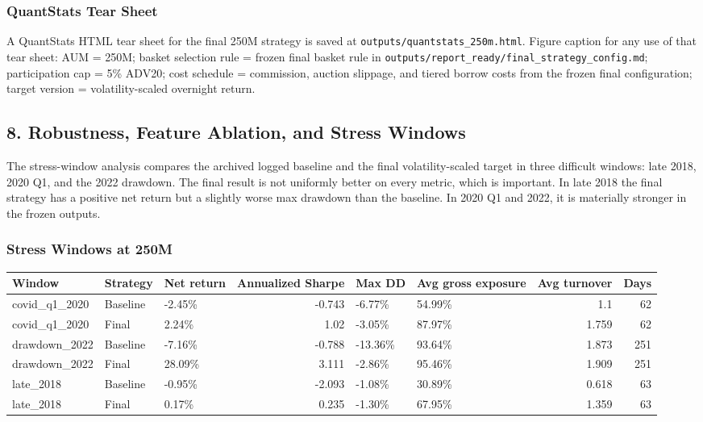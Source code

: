 \documentclass[
]{article}
\begin{document}
\hypertarget{quantstats-tear-sheet}{%
\subsubsection{QuantStats Tear Sheet}\label{quantstats-tear-sheet}}

A QuantStats HTML tear sheet for the final 250M strategy is saved at
\texttt{outputs/quantstats\_250m.html}. Figure caption for any use of
that tear sheet: AUM = 250M; basket selection rule = frozen final basket
rule in \texttt{outputs/report\_ready/final\_strategy\_config.md};
participation cap = 5\% ADV20; cost schedule = commission, auction
slippage, and tiered borrow costs from the frozen final configuration;
target version = volatility-scaled overnight return.

\hypertarget{8-robustness-feature-ablation-and-stress-windows}{%
\subsection{8. Robustness, Feature Ablation, and Stress
Windows}\label{8-robustness-feature-ablation-and-stress-windows}}

The stress-window analysis compares the archived logged baseline and the
final volatility-scaled target in three difficult windows: late 2018,
2020 Q1, and the 2022 drawdown. The final result is not uniformly better
on every metric, which is important. In late 2018 the final strategy has
a positive net return but a slightly worse max drawdown than the
baseline. In 2020 Q1 and 2022, it is materially stronger in the frozen
outputs.

\hypertarget{stress-windows-at-250m}{%
\subsubsection{Stress Windows at 250M}\label{stress-windows-at-250m}}

\begin{longtable}[]{@{}lllrllrr@{}}
\toprule
Window & Strategy & Net return & Annualized Sharpe & Max DD & Avg gross
exposure & Avg turnover & Days \\
\midrule
\endhead
covid\_q1\_2020 & Baseline & -2.45\% & -0.743 & -6.77\% & 54.99\% & 1.1
& 62 \\
covid\_q1\_2020 & Final & 2.24\% & 1.02 & -3.05\% & 87.97\% & 1.759 &
62 \\
drawdown\_2022 & Baseline & -7.16\% & -0.788 & -13.36\% & 93.64\% &
1.873 & 251 \\
drawdown\_2022 & Final & 28.09\% & 3.111 & -2.86\% & 95.46\% & 1.909 &
251 \\
late\_2018 & Baseline & -0.95\% & -2.093 & -1.08\% & 30.89\% & 0.618 &
63 \\
late\_2018 & Final & 0.17\% & 0.235 & -1.30\% & 67.95\% & 1.359 & 63 \\
\bottomrule
\end{longtable}
\end{document}

